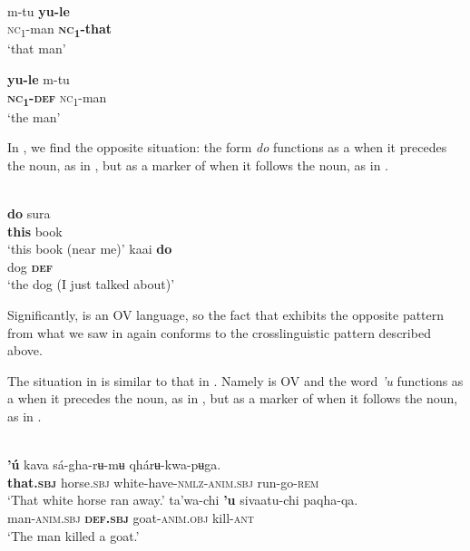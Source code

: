 \documentclass[output=paper]{langsci/langscibook}
\begin{document}
\ea\label{ex:dryer:37}
\\
  \ea \gll  m-tu  \textbf{yu-le}\\
	  \textsc{nc}\textsubscript{1}{}-man  \textbf{\textsc{nc}}\textbf{\textsubscript{1}}\textbf{{}-that}\\
  \glt     ‘that man’

  \ex
  \gll    \textbf{yu-le}  m-tu\\
	  \textbf{\textsc{nc}}\textbf{\textsubscript{1}}\textbf{{}-}\textbf{\textsc{def}}  \textsc{nc}\textsubscript{1}{}-man\\
  \glt     ‘the man’
  \z
\z

In , we find the opposite situation: the form \textit{do} functions as a  when it precedes the noun, as in , but as a marker of  when it follows the noun, as in .

\ea\label{ex:dryer:38}
\\
\ea\label{ex:dryer:38a}
\gll     \textbf{do}  sura  \\  
         \textbf{this}  book\\    
\glt     ‘this book (near me)’  
\ex \label{ex:dryer:38b}
\gll kaai  \textbf{do}\\
    dog  \textbf{\textsc{def}}\\
\glt  ‘the dog (I just talked about)’
\z
\z

\noindent Significantly,  is an OV language, so the fact that  exhibits the opposite pattern from what we saw in  again conforms to the crosslinguistic pattern described above.

The situation in  is similar to that in . Namely  is OV and the word \textit{'u} functions as a  when it precedes the noun, as in , but as a marker of  when it follows the noun, as in .

\ea\label{ex:dryer:39}
\\
\ea\label{ex:dryer:39a}
\gll     \textbf{'ú}  kava  sá-gha-rʉ-mʉ  qhárʉ-kwa-pʉga.\\
         \textbf{that.\textsc{sbj}}  horse.\textsc{sbj}  white-have-\textsc{nmlz-anim.sbj}  run-go-\textsc{rem}\\
\glt     ‘That white horse ran away.’
\ex\label{ex:dryer:39b}
\gll    ta'wa-chi  \textbf{'u}  sivaatu-chi  paqha-qa.\\
         man-\textsc{anim.sbj}  \textbf{\textsc{def.sbj}}  goat-\textsc{anim.obj}  kill-\textsc{ant}\\
\glt     ‘The man killed a goat.’
\z
\z
\end{document}

